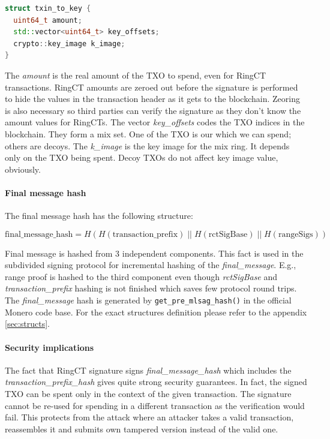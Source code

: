\documentclass[]{article}
\begin{document}
\begin{lstlisting}[language=c++]
struct txin_to_key {
  uint64_t amount;
  std::vector<uint64_t> key_offsets;
  crypto::key_image k_image;
}
\end{lstlisting}

The \emph{amount} is the real amount of the TXO to spend, even for RingCT transactions. RingCT amounts are zeroed out before the signature is performed to hide the values in the transaction header as it gets to the blockchain. Zeoring is also necessary so third parties can verify the signature as they don't know the amount values for RingCTs.
The vector \emph{key\_offsets} codes the TXO indices in the blockchain. They form a mix set. One of the TXO is our which we can spend; others are decoys.
The \emph{k\_image} is the key image for the mix ring. It depends only on the TXO being spent. Decoy TXOs do not affect key image value, obviously.

\paragraph{Final message hash} The final message hash has the following structure:
	
\begin{equation}  \label{eq:final_message_hash}
\text{final\_message\_hash} = H(H(\text{transaction\_prefix}) \; || \; H(\text{rctSigBase}) \; || \; H(\text{rangeSigs}))
\end{equation}

Final message is hashed from 3 independent components. This fact is used in the subdivided signing protocol for incremental hashing of the \emph{final\_message}. E.g., range proof is hashed to the third component even though \emph{rctSigBase} and \emph{transaction\_prefix} hashing is not finished which saves few protocol round trips.
The \emph{final\_message} hash is generated by \verb|get_pre_mlsag_hash()| in the official Monero code base.
For the exact structures definition please refer to the appendix \ref{sec:structs}.

\paragraph{Security implications}
The fact that RingCT signature signs \emph{final\_message\_hash} which includes the \emph{transaction\_prefix\_hash} gives quite strong security guarantees. In fact, the signed TXO can be spent only in the context of the given transaction. The signature cannot be re-used for spending in a different transaction as the verification would fail. This protects from the attack where an attacker takes a valid transaction, reassembles it and submits own tampered version instead of the valid one.
\end{document}
